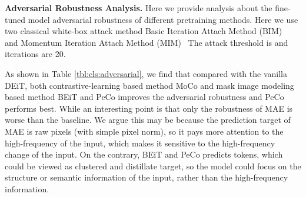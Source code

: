 \documentclass[letterpaper]{article} \usepackage{aaai23}  \usepackage{times}  \usepackage{helvet}  \usepackage{courier}  \usepackage[hyphens]{url}  \usepackage{graphicx} \urlstyle{rm} \def\UrlFont{\rm}  \usepackage{natbib}  \usepackage{caption} \frenchspacing  \setlength{\pdfpagewidth}{8.5in}  \setlength{\pdfpageheight}{11in}  \usepackage{algorithm}
\begin{document}
\begin{table}[h]
\centering 

\caption{Illustrating the effect of loss weight of perceptual similarity.
We show fine-tune accuracy (\%) on ImageNet-K. 
Enlarging the loss weight can not get consistent improvement, may due to the loss of local details.}

\label{tab:peco_different_percep}
\end{table}


\noindent \textbf{Adversarial Robustness Analysis.}
Here we provide analysis about the fine-tuned model adversarial robustness of different pretraining methods. Here we use two classical white-box attack method Basic Iteration Attach Method (BIM)~\cite{kurakin2016adversarial} and Momentum Iteration Attach Method (MIM)~\cite{dong2018boosting}
The attack threshold is  and iterations are 20. 

As shown in Table \ref{tbl:cls:adversarial}, we find that compared with the vanilla DEiT, both contrastive-learning based method MoCo and mask image modeling based method BEiT and PeCo improves the adversarial robustness and PeCo performs best. While an interesting point is that only the robustness of MAE is worse than the baseline. We argue this may be because the prediction target of MAE is raw pixels (with simple pixel norm), so it pays more attention to the high-frequency of the input, which makes it sensitive to the high-frequency change of the input. On the contrary, BEiT and PeCo predicts tokens, which could be viewed as clustered and distillate target,  so the model could focus on the structure or semantic information of the input, rather than the high-frequency information.
\end{document}
